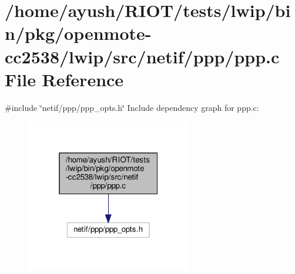 \hypertarget{openmote-cc2538_2lwip_2src_2netif_2ppp_2ppp_8c}{}\section{/home/ayush/\+R\+I\+O\+T/tests/lwip/bin/pkg/openmote-\/cc2538/lwip/src/netif/ppp/ppp.c File Reference}
\label{openmote-cc2538_2lwip_2src_2netif_2ppp_2ppp_8c}
{\ttfamily \#include \char`\"{}netif/ppp/ppp\+\_\+opts.\+h\char`\"{}}\newline
Include dependency graph for ppp.\+c\+:
\nopagebreak
\begin{figure}[H]
\begin{center}
\leavevmode
\includegraphics[width=205pt]{openmote-cc2538_2lwip_2src_2netif_2ppp_2ppp_8c__incl}
\end{center}
\end{figure}
